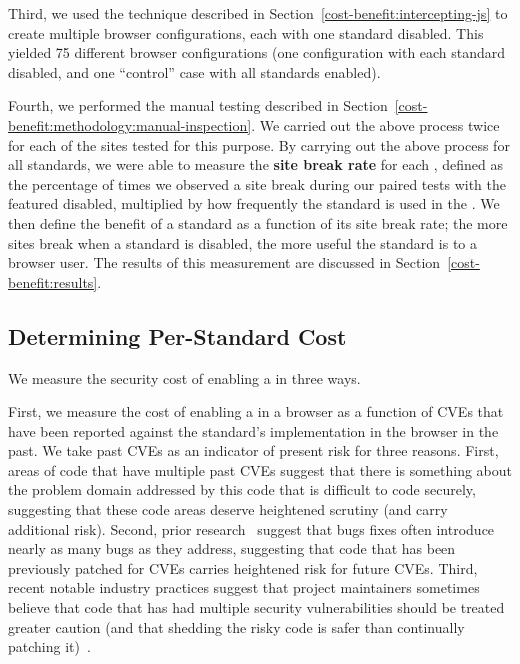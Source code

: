 Third, we used the technique described in Section~\ref{cost-benefit:intercepting-js}
to create multiple browser configurations, each with one standard disabled.
This yielded 75 different browser configurations (one configuration with each standard
disabled, and one ``control'' case with all standards enabled).

Fourth, we performed the manual testing described in
Section~\ref{cost-benefit:methodology:manual-inspection}.  We carried out the above process
twice for each of the \NumSitesTestedInStandardTests sites tested for this
purpose.  By carrying out the above process for all \NumStandards standards,
we were able to measure the \textbf{site break rate} for each \WAS, defined as the
percentage of times we observed a site break during our paired tests
with the featured disabled, multiplied by how frequently
the standard is used in the \ATK.  We then define the benefit of a standard as a
function of its site break rate; the more sites break when a standard is disabled,
the more useful the standard is to a browser user.  The results of this
measurement are discussed in Section~\ref{cost-benefit:results}.


\subsection{Determining Per-Standard Cost}
\label{cost-benefit:methodology:per-standard-cost}
We measure the security cost of enabling a \WAS in three ways.

First, we measure the cost of enabling a \WAS in a browser as a function of CVEs
that have been reported against the standard's implementation in the browser
 in the past.  We take past CVEs as an indicator of present
risk for three reasons.  First, areas of code that have multiple past CVEs
suggest that there is something about the problem domain addressed by this code
that is difficult to code securely, suggesting that these code areas deserve
heightened scrutiny (and carry additional risk).  Second, prior
research~\cite{ozment2006milk,zimmermann2008predicting} suggest that bugs fixes
often introduce nearly as many bugs as they address, suggesting that code that
has been previously patched for CVEs carries heightened risk for future CVEs.
Third, recent notable industry practices suggest that project maintainers
sometimes believe that code that has had multiple security vulnerabilities
should be treated greater caution (and that shedding the risky code is safer
than continually patching it)~\cite{boringssl}.

